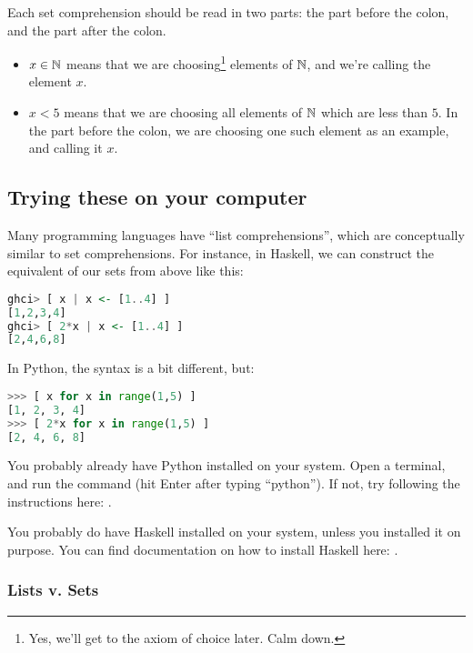 Each set comprehension should be read in two parts: the part before
the colon, and the part after the colon.

\begin{itemize}
\item $x \in \mathbb{N}$ means that we are choosing\footnote{Yes, we'll get to
    the axiom of choice later. Calm down.} elements of $\mathbb{N}$, and we're
  calling the element $x$.
\item $x < 5$ means that we are choosing all elements of $\mathbb{N}$ which
  are less than $5$. In the part before the colon, we are choosing one
  such element as an example, and calling it $x$.
\end{itemize}

\subsection{Trying these on your computer}

Many programming languages have ``list comprehensions'', which are
conceptually similar to set comprehensions. For instance, in Haskell,
we can construct the equivalent of our sets from above like this:

\begin{lstlisting}[language=Haskell,caption={The sets from above, in Haskell}]
ghci> [ x | x <- [1..4] ]
[1,2,3,4]
ghci> [ 2*x | x <- [1..4] ]
[2,4,6,8]
\end{lstlisting}

In Python, the syntax is a bit different, but:

\begin{lstlisting}[language=Python,caption={The same thing in Python}]
>>> [ x for x in range(1,5) ]
[1, 2, 3, 4]
>>> [ 2*x for x in range(1,5) ]
[2, 4, 6, 8]
\end{lstlisting}

You probably already have Python installed on your system. Open a
terminal, and run the command  (hit Enter after
typing ``python''). If not, try following the instructions here:
.

You probably do  have Haskell installed on your system,
unless you installed it on purpose. You can find documentation on how
to install Haskell here: .

\subsubsection{Lists v. Sets}

